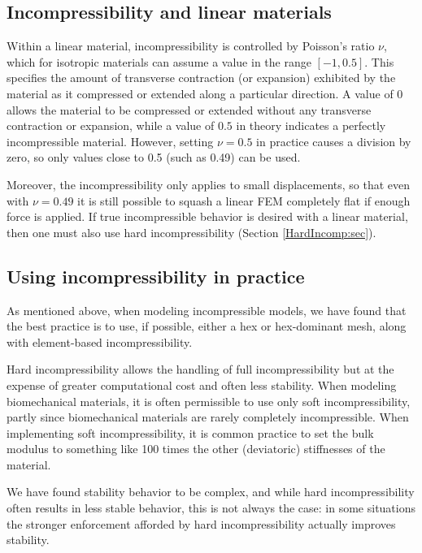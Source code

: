 \subsection{Incompressibility and linear materials}
\label{IncompLinearMaterials:sec}

Within a linear material, incompressibility is controlled by Poisson's
ratio $\nu$, which for isotropic materials can assume a value in the
range $[-1, 0.5]$. This specifies the amount of transverse contraction
(or expansion) exhibited by the material as it compressed or extended
along a particular direction. A value of $0$ allows the material to be
compressed or extended without any transverse contraction or
expansion, while a value of $0.5$ in theory indicates a perfectly
incompressible material. However, setting $\nu = 0.5$ in practice
causes a division by zero, so only values close to 0.5 (such as 0.49)
can be used. 

Moreover, the incompressibility only applies to small displacements,
so that even with $\nu = 0.49$ it is still possible to squash a linear
FEM completely flat if enough force is applied. If true incompressible
behavior is desired with a linear material, then one must also use
hard incompressibility (Section \ref{HardIncomp:sec}).

\subsection{Using incompressibility in practice}

As mentioned above, when modeling incompressible models, we have found
that the best practice is to use, if possible, either a hex or
hex-dominant mesh, along with element-based incompressibility.

Hard incompressibility allows the handling of full incompressibility
but at the expense of greater computational cost and often less
stability. When modeling biomechanical materials, it is often
permissible to use only soft incompressibility, partly since
biomechanical materials are rarely completely incompressible.  When
implementing soft incompressibility, it is common practice to set the
bulk modulus to something like 100 times the other (deviatoric)
stiffnesses of the material.

We have found stability behavior to be complex, and while hard
incompressibility often results in less stable behavior, this is not
always the case: in some situations the stronger enforcement afforded
by hard incompressibility actually improves stability.

